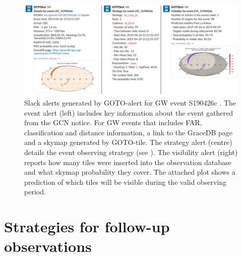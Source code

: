 \begin{colsection}
\begin{figure}
    \begin{center}
        \includegraphics[width=\linewidth]{images/slack_alert_side2.png}
    \end{center}
    \caption[Slack alerts created by GOTO-alert for a GW event]{
        Slack alerts generated by GOTO-alert for GW event S190426c \citep{S190426c}.
        The event alert (left) includes key information about the event gathered from the GCN notice. For GW events that includes FAR, classification and distance information, a link to the GraceDB page and a skymap generated by GOTO-tile.
        The strategy alert (centre) details the event observing strategy (see ).
        The visibility alert (right) reports how many tiles were inserted into the observation database and what skymap probability they cover. The attached plot shows a prediction of which tiles will be visible during the valid observing period.
    }\label{fig:gotoalert_slack}
\end{figure}

\end{colsection}


\section{Strategies for follow-up observations}
\label{sec:strategy}


